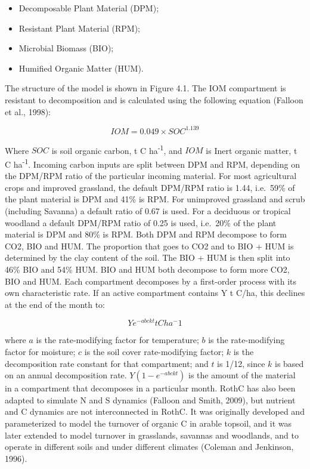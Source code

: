 \documentclass[
  10pt,
  b5paper,
]{book}
\providecommand{\tightlist}{%
  \setlength{\itemsep}{0pt}\setlength{\parskip}{0pt}}
\begin{document}
\begin{itemize}
\tightlist
\item
  Decomposable Plant Material (DPM);
\item
  Resistant Plant Material (RPM);
\item
  Microbial Biomass (BIO);
\item
  Humified Organic Matter (HUM).
\end{itemize}

The structure of the model is shown in Figure 4.1.
The IOM compartment is resistant to decomposition and is calculated using the following equation (Falloon et al., 1998):

\begin{equation}
\tag{4.1}
IOM = 0.049 \times SOC^{1.139} 
\end{equation}

Where \(SOC\) is soil organic carbon, t C ha\textsuperscript{-1}, and \(IOM\) is Inert organic matter, t C ha\textsuperscript{-1}.
Incoming carbon inputs are split between DPM and RPM, depending on the DPM/RPM ratio of the particular incoming material. For most agricultural crops and improved grassland, the default DPM/RPM ratio is 1.44, i.e.~59\% of the plant material is DPM and 41\% is RPM. For unimproved grassland and scrub (including Savanna) a default ratio of 0.67 is used. For a deciduous or tropical woodland a default DPM/RPM ratio of 0.25 is used, i.e.~20\% of the plant material is DPM and 80\% is RPM.
Both DPM and RPM decompose to form CO2, BIO and HUM. The proportion that goes to CO2 and to BIO + HUM is determined by the clay content of the soil. The BIO + HUM is then split into 46\% BIO and 54\% HUM. BIO and HUM both decompose to form more CO2, BIO and HUM. Each compartment decomposes by a first-order process with its own characteristic rate. If an active compartment contains Y t C/ha, this declines at the end of the month to:

\begin{equation}
\tag{4.2}
Y e^{-abckt} t C ha^-1 
\end{equation}

where \(a\) is the rate-modifying factor for temperature; \(b\) is the rate-modifying factor for moisture; \(c\) is the soil cover rate-modifying factor; \(k\) is the decomposition rate constant for that compartment; and \(t\) is 1/12, since \(k\) is based on an annual decomposition rate. \(Y (1 - e^{-abckt})\) is the amount of the material in a compartment that decomposes in a particular month.
RothC has also been adapted to simulate N and S dynamics (Falloon and Smith, 2009), but nutrient and C dynamics are not interconnected in RothC. It was originally developed and parameterized to model the turnover of organic C in arable topsoil, and it was later extended to model turnover in grasslands, savannas and woodlands, and to operate in different soils and under different climates (Coleman and Jenkinson, 1996).
\end{document}
